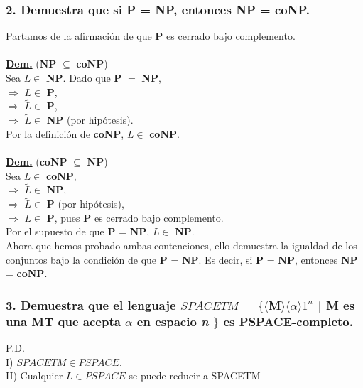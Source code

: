 \documentclass[12pt]{article}
\begin{document}
\subsubsection*{2. Demuestra que si P = NP, entonces NP = coNP.}
Partamos de la afirmación de que \textbf{P} es cerrado bajo complemento.\\
\noindent\\
\underline{\textbf{Dem.}} (\textbf{NP} $\subseteq$ \textbf{coNP}) \\
Sea $L \in $ \textbf{NP}. Dado que \textbf{P} $=$ \textbf{NP},\\
$\Rightarrow$ $L \in $ \textbf{P},\\
$\Rightarrow$ $\widetilde{L} \in $ \textbf{P}, \\
$\Rightarrow$ $\widetilde{L} \in $ \textbf{NP} (por hipótesis). \\Por la definición de \textbf{coNP}, $L \in $ \textbf{coNP}.\\
\noindent \\
\underline{\textbf{Dem.}} (\textbf{coNP} $\subseteq$ \textbf{NP}) \\
Sea $L \in $ \textbf{coNP},\\
$\Rightarrow$ $\widetilde{L} \in $ \textbf{NP},\\
$\Rightarrow$ $\widetilde{L} \in $ \textbf{P} (por hipótesis),\\
$\Rightarrow$ $L \in $ \textbf{P}, pues \textbf{P} es cerrado bajo complemento.\\
Por el supuesto de que \textbf{P} = \textbf{NP}, ${L} \in $ \textbf{NP}. \\

Ahora que hemos probado ambas contenciones, ello demuestra la igualdad de los conjuntos bajo la condición de que \textbf{P} = \textbf{NP}.
Es decir, si \textbf{P} = \textbf{NP}, entonces \textbf{NP} = \textbf{coNP}.


\subsubsection*{3. Demuestra que el lenguaje $SPACETM$ = $\{ \langle$M$\rangle \langle \alpha \rangle 1^n$ | M es una MT que acepta $\alpha$ en espacio \textit{n} $\}$ es PSPACE-completo.}

 P.D.\\


I) $SPACETM \in PSPACE.$\\

II) Cualquier $L \in PSPACE$ se puede reducir a SPACETM\\
 
\end{document}
